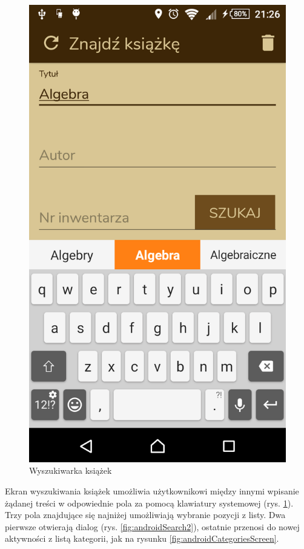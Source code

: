 \documentclass[twoside]{projektInzynierskiMS}
\begin{document}
\begin{figure}[h]
  \centering
  \includegraphics[width=0.4\linewidth]{img/android/android2.png}
  \caption{Wyszukiwarka książek}
  \label{fig:searchScreen}
\end{figure}

Ekran wyszukiwania książek umożliwia użytkownikowi między innymi wpisanie żądanej treści w odpowiednie pola za pomocą klawiatury systemowej (rys. \ref{fig:searchScreen}). Trzy pola znajdujące się najniżej umożliwiają wybranie pozycji z listy. Dwa pierwsze otwierają dialog (rys. \ref{fig:androidSearch2}), ostatnie przenosi do nowej aktywności z listą kategorii, jak na rysunku \ref{fig:androidCategoriesScreen}.
\end{document}
